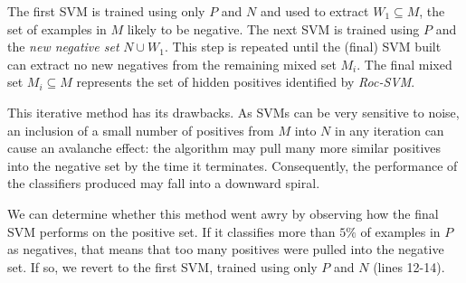 \documentclass[12pt,twoside,notitlepage,amsart]{report} %
\begin{document}
	The first SVM is trained using only $P$ and $N$ and used to extract $W_1 \subseteq M$, the set of examples in $M$ likely to be negative. The next SVM is trained using $P$ and the \emph{new negative set} $N \cup W_1$. This step is repeated until the (final) SVM built can extract no new negatives from the remaining mixed set $M_i$. The final mixed set $M_i \subseteq M$ represents the set of hidden positives identified by \emph{Roc-SVM}. 
	
	This iterative method has its drawbacks. As SVMs can be very sensitive to noise, an inclusion of a small number of positives from $M$ into $N$ in any iteration can cause an avalanche effect: the algorithm may pull many more similar positives into the negative set by the time it terminates. Consequently, the performance of the classifiers produced may fall into a downward spiral. 
	
	We can determine whether this method went awry by observing how the final SVM performs on the positive set. If it classifies more than $5\%$ of examples in $P$ as negatives, that means that too many positives were pulled into the negative set. If so, we revert to the first SVM, trained using only $P$ and $N$ (lines 12-14). 
	
	\renewcommand{\thealgorithm}{2.3}
	
\end{document}
